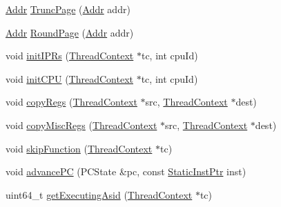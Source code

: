 \begin{DoxyCompactItemize}
\hyperlink{base_2types_8hh_af1bb03d6a4ee096394a6749f0a169232}{Addr} \hyperlink{namespaceAlphaISA_aa30de8739aa107005b5f69984513fc8f}{TruncPage} (\hyperlink{base_2types_8hh_af1bb03d6a4ee096394a6749f0a169232}{Addr} addr)
\item 
\hyperlink{base_2types_8hh_af1bb03d6a4ee096394a6749f0a169232}{Addr} \hyperlink{namespaceAlphaISA_a31ed8a5ee9eabb285172c3e8b40e0427}{RoundPage} (\hyperlink{base_2types_8hh_af1bb03d6a4ee096394a6749f0a169232}{Addr} addr)
\item 
void \hyperlink{namespaceAlphaISA_a69ad890f318cd923f9a65897a06cbf50}{initIPRs} (\hyperlink{classThreadContext}{ThreadContext} $\ast$tc, int cpuId)
\item 
void \hyperlink{namespaceAlphaISA_aded557a1e716c6f849b0e0b05fc77676}{initCPU} (\hyperlink{classThreadContext}{ThreadContext} $\ast$tc, int cpuId)
\item 
void \hyperlink{namespaceAlphaISA_aaeffcccf262b0dbd3cbcc8b4cef41168}{copyRegs} (\hyperlink{classThreadContext}{ThreadContext} $\ast$src, \hyperlink{classThreadContext}{ThreadContext} $\ast$dest)
\item 
void \hyperlink{namespaceAlphaISA_a42833096094e5ff0f2de948bf8e5965c}{copyMiscRegs} (\hyperlink{classThreadContext}{ThreadContext} $\ast$src, \hyperlink{classThreadContext}{ThreadContext} $\ast$dest)
\item 
void \hyperlink{namespaceAlphaISA_a2624d7d8bac3eb03de2eb6e83903c208}{skipFunction} (\hyperlink{classThreadContext}{ThreadContext} $\ast$tc)
\item 
void \hyperlink{namespaceAlphaISA_add1b209af0281827d9ac0a67747a3bf7}{advancePC} (PCState \&pc, const \hyperlink{classRefCountingPtr}{StaticInstPtr} inst)
\item 
uint64\_\-t \hyperlink{namespaceAlphaISA_abb48fd2963e6ebf6b013e5546f1f7d87}{getExecutingAsid} (\hyperlink{classThreadContext}{ThreadContext} $\ast$tc)
\end{DoxyCompactItemize}
